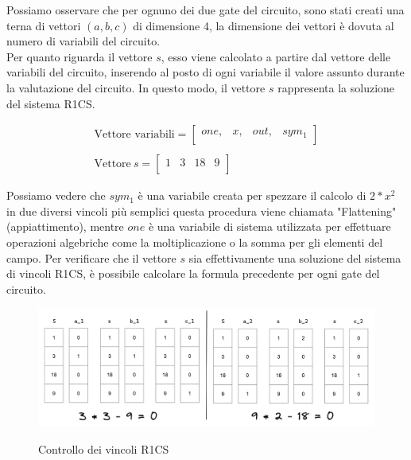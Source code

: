 \begin{enumerate}
    Possiamo osservare che per ognuno dei due gate del circuito, sono stati creati una terna di vettori $(a,b,c)$ di
    dimensione 4, la dimensione dei vettori è dovuta al numero di variabili del circuito. \\
    Per quanto riguarda il vettore $s$, esso viene calcolato a partire dal vettore delle variabili del circuito,
    inserendo al posto di ogni variabile il valore assunto durante la valutazione del circuito. In questo modo, il
    vettore $s$ rappresenta la soluzione del sistema R1CS.

    \begin{gather*}
        \text{Vettore variabili} =
        \begin{bmatrix}
            one, & x, & out, & sym_1 \\
        \end{bmatrix}
        \\
        \\
        \text{Vettore} \ s =
        \begin{bmatrix}
        1 & 3 & 18 & 9 \\
        \end{bmatrix}
    \end{gather*}

    Possiamo vedere che $sym_1$ è una variabile creata per spezzare il calcolo di $2*x^2$ in due diversi vincoli più
    semplici questa procedura viene chiamata "Flattening" (appiattimento), mentre $one$ è una variabile di sistema
    utilizzata per effettuare operazioni algebriche come la moltiplicazione o la somma per gli elementi del campo. Per
    verificare che il vettore $s$ sia effettivamente una soluzione del sistema di vincoli R1CS, è possibile calcolare la
    formula precedente per ogni gate del circuito.

    \begin{figure}[H]
        \centering
        \includegraphics[width=15cm]{./chapters/1.state-of-art/images/10.check_r1cs.png}
        \label{fig:check-r1cs}
        \captionsetup{justification=centering}
        \caption{Controllo dei vincoli R1CS}
    \end{figure}


\end{enumerate}
